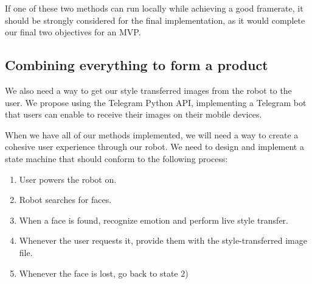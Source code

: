 If one of these two methods can run locally while achieving a good framerate, it should be strongly considered for the final implementation, as it would complete our final two objectives for an MVP.

\subsection{Combining everything to form a product}


We also need a way to get our style transferred images from the robot to the user. We propose using the Telegram Python API, implementing a Telegram bot that users can enable to receive their images on their mobile devices.

When we have all of our methods implemented, we will need a way to create a cohesive user experience through our robot. We need to design and implement a state machine that should conform to the following process:


\begin{enumerate}
  \item User powers the robot on.
  \item Robot searches for faces.
  \item When a face is found, recognize emotion and perform live style transfer.
  \item Whenever the user requests it, provide them with the style-transferred image file.
  \item Whenever the face is lost, go back to state 2)
\end{enumerate}